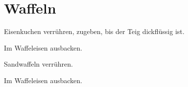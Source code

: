 \section{Waffeln}

\begin{recipe}{Eisenkuchen}
  verrühren,
  zugeben, bis der Teig dickflüssig ist.

  Im Waffeleisen ausbacken.
\end{recipe}



\begin{recipe}{Sandwaffeln}
  verrühren.
  
  Im Waffeleisen ausbacken.
\end{recipe}
